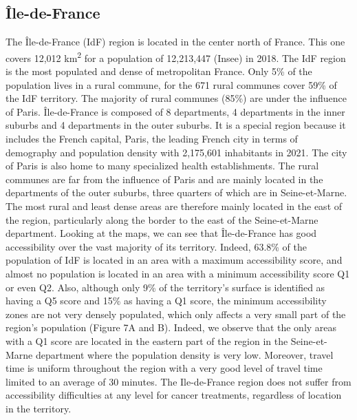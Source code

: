\subsection*{Île-de-France}

The Île-de-France (IdF) region is located in the center north of France. This
one covers 12,012 km\textsuperscript{2} for a population of 12,213,447 (Insee)
in 2018. The IdF region is the most populated and dense of metropolitan France.
Only 5\% of the population lives in a rural commune, for the 671 rural communes
cover 59\% of the IdF territory. The majority of rural communes (85\%) are under
the influence of Paris. Île-de-France is composed of 8 departments, 4
departments in the inner suburbs and 4 departments in the outer suburbs. It is a
special region because it includes the French capital, Paris, the leading French
city in terms of demography and population density with 2,175,601 inhabitants in
2021. The city of Paris is also home to many specialized health establishments.
The rural communes are far from the influence of Paris and are mainly located in
the departments of the outer suburbs, three quarters of which are in
Seine-et-Marne. The most rural and least dense areas are therefore mainly
located in the east of the region, particularly along the border to the east of
the Seine-et-Marne department. Looking at the maps, we can see that
Île-de-France has good accessibility over the vast majority of its territory.
Indeed, 63.8\% of the population of IdF is located in an area with a maximum
accessibility score, and almost no population is located in an area with a
minimum accessibility score Q1 or even Q2. Also, although only 9\% of the
territory's surface is identified as having a Q5 score and 15\% as having a Q1
score, the minimum accessibility zones are not very densely populated, which
only affects a very small part of the region's population (Figure 7A and B).
Indeed, we observe that the only areas with a Q1 score are located in the
eastern part of the region in the Seine-et-Marne department where the population
density is very low. Moreover, travel time is uniform throughout the region with
a very good level of travel time limited to an average of 30 minutes. The
Ile-de-France region does not suffer from accessibility difficulties at any
level for cancer treatments, regardless of location in the territory.

